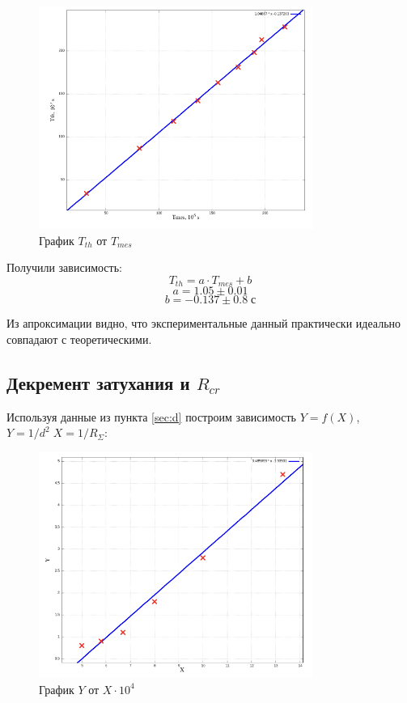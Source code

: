 \documentclass[11pt]{article}
\begin{document}
\begin{figure}[H]
    \centering
    \includegraphics[width=0.8\textwidth]{T-T-res.png}
    \caption{График \(T_{th}\) от \(T_{mes}\)}
    \label{fig:T-T}
\end{figure}

Получили зависимость:
\[ T_{th} = a\cdot T_{mes} + b\]
\[ a = 1.05 \pm 0.01 \]
\[ b = -0.137 \pm 0.8\; с \]

Из апроксимации видно, что экспериментальные данный практически идеально совпадают с теоретическими.
\subsection{Декремент затухания и \(R_{cr}\)}
Используя данные из пункта \ref{sec:d} построим зависимость \( Y = f ( X ) \),
\(Y = 1/d^2\; X = 1/R_{\Sigma}\):
\begin{figure}[H]
    \centering
    \includegraphics[width=0.8\textwidth]{d.png}
    \caption{График \(Y\) от \(X\cdot 10^4\)}
    \label{fig:d}
\end{figure}
\end{document}
